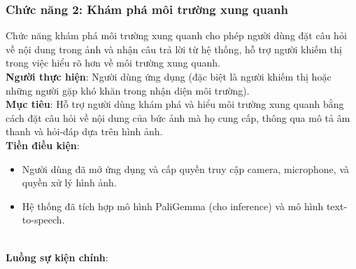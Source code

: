 \documentclass[a4paper,12pt]{article}
\begin{document}
\subsubsection{Chức năng 2: Khám phá môi trường xung quanh}
Chức năng khám phá môi trường xung quanh cho phép người dùng đặt câu hỏi về nội dung trong ảnh và nhận câu trả lời từ hệ thống, hỗ trợ người khiếm thị trong việc hiểu rõ hơn về môi trường xung quanh.
\\
\textbf{Người thực hiện}: Người dùng ứng dụng (đặc biệt là người khiếm thị hoặc những người gặp khó khăn trong nhận diện môi trường).
\\
\textbf{Mục tiêu}: Hỗ trợ người dùng khám phá và hiểu môi trường xung quanh bằng cách đặt câu hỏi về nội dung của bức ảnh mà họ cung cấp, thông qua mô tả âm thanh và hỏi-đáp dựa trên hình ảnh.
\\
\textbf{Tiền điều kiện}:
\begin{itemize}
    \item Người dùng đã mở ứng dụng và cấp quyền truy cập camera, microphone, và quyền xử lý hình ảnh.
    \item Hệ thống đã tích hợp mô hình PaliGemma (cho inference) và mô hình text-to-speech.
\end{itemize}
\\
\textbf{Luồng sự kiện chính}:
\\
\end{document}
